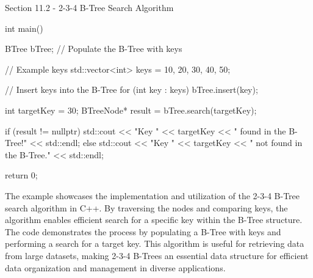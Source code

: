 \begin{notes}{Section 11.2 - 2-3-4 B-Tree Search Algorithm}
\begin{highlight}
\begin{code}[C++]
    int main() {
        BTree bTree;
        // Populate the B-Tree with keys
    
        // Example keys
        std::vector<int> keys = {10, 20, 30, 40, 50};
        
        // Insert keys into the B-Tree
        for (int key : keys) {
            bTree.insert(key);
        }
    
        int targetKey = 30;
        BTreeNode* result = bTree.search(targetKey);
        
        if (result != nullptr) {
            std::cout << "Key " << targetKey 
            << " found in the B-Tree!" << std::endl;
        } else {
            std::cout << "Key " << targetKey 
            << " not found in the B-Tree." << std::endl;
        }
    
        return 0;
    }
    \end{code}
        The example showcases the implementation and utilization of the 2-3-4 B-Tree search algorithm in C++. By traversing the nodes and comparing keys, the algorithm enables efficient search for a specific key within the B-Tree structure. The code demonstrates the process by populating a B-Tree with keys and performing a search for a target key. 
        This algorithm is useful for retrieving data from large datasets, making 2-3-4 B-Trees an essential data structure for efficient data organization and management in diverse applications.
    \end{highlight}
\end{notes}

